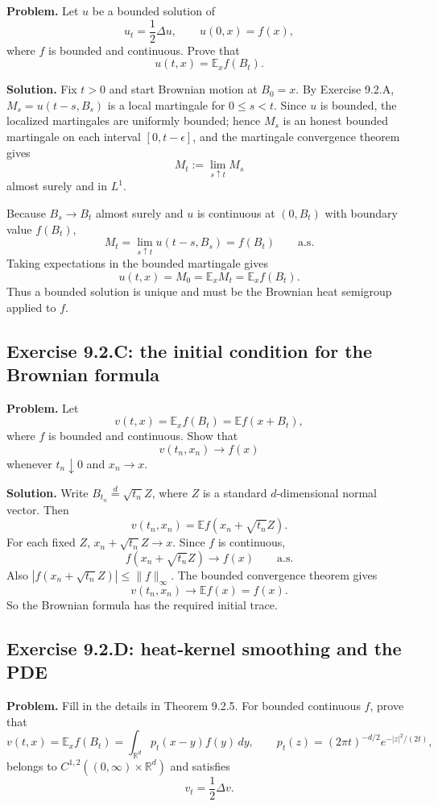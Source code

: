 \documentclass[11pt]{article}
\newcommand{\R}{\mathbb{R}}
\newcommand{\E}{\mathbb{E}}
\newcommand{\dd}{\,d}
\newcommand{\Del}{\Delta}
\begin{document}
\noindent\textbf{Problem.}
Let $u$ be a bounded solution of
\[
  u_t=\frac12\Del u,\qquad
  u(0,x)=f(x),
\]
where $f$ is bounded and continuous.  Prove that
\[
  u(t,x)=\E_x f(B_t).
\]

\noindent\textbf{Solution.}
Fix $t>0$ and start Brownian motion at $B_0=x$.  By Exercise 9.2.A,
$M_s=u(t-s,B_s)$ is a local martingale for $0\le s<t$.  Since $u$ is
bounded, the localized martingales are uniformly bounded; hence
$M_s$ is an honest bounded martingale on each interval $[0,t-\epsilon]$,
and the martingale convergence theorem gives
\[
  M_t:=\lim_{s\uparrow t}M_s
\]
almost surely and in $L^1$.

Because $B_s\to B_t$ almost surely and $u$ is continuous at
$(0,B_t)$ with boundary value $f(B_t)$,
\[
  M_t
  =
  \lim_{s\uparrow t}u(t-s,B_s)
  =
  f(B_t)
  \qquad \text{a.s.}
\]
Taking expectations in the bounded martingale gives
\[
  u(t,x)=M_0=\E_x M_t=\E_x f(B_t).
\]
Thus a bounded solution is unique and must be the Brownian heat
semigroup applied to $f$.

\subsection*{Exercise 9.2.C: the initial condition for the Brownian formula}

\noindent\textbf{Problem.}
Let
\[
  v(t,x)=\E_x f(B_t)=\E f(x+B_t),
\]
where $f$ is bounded and continuous.  Show that
\[
  v(t_n,x_n)\to f(x)
\]
whenever $t_n\downarrow0$ and $x_n\to x$.

\noindent\textbf{Solution.}
Write $B_{t_n}\stackrel{d}{=}\sqrt{t_n}Z$, where
$Z$ is a standard $d$-dimensional normal vector.  Then
\[
  v(t_n,x_n)=\E f(x_n+\sqrt{t_n}Z).
\]
For each fixed $Z$, $x_n+\sqrt{t_n}Z\to x$.  Since $f$ is continuous,
\[
  f(x_n+\sqrt{t_n}Z)\to f(x)
  \qquad \text{a.s.}
\]
Also $|f(x_n+\sqrt{t_n}Z)|\le \|f\|_\infty$.  The bounded convergence
theorem gives
\[
  v(t_n,x_n)\to \E f(x)=f(x).
\]
So the Brownian formula has the required initial trace.

\subsection*{Exercise 9.2.D: heat-kernel smoothing and the PDE}

\noindent\textbf{Problem.}
Fill in the details in Theorem 9.2.5.  For bounded continuous $f$, prove
that
\[
  v(t,x)=\E_x f(B_t)
  =
  \int_{\R^d}p_t(x-y)f(y)\dd y,
  \qquad
  p_t(z)=(2\pi t)^{-d/2}e^{-|z|^2/(2t)},
\]
belongs to $C^{1,2}((0,\infty)\times\R^d)$ and satisfies
\[
  v_t=\frac12\Del v.
\]
\end{document}

